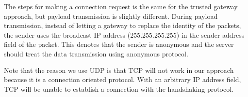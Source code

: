 The steps for making a connection request is the same for the
trusted gateway approach, but payload transmission is slightly
different. During payload transmission, instead of letting a
gateway to replace the identity of the packets, the sender uses
the broadcast IP address (255.255.255.255) in the sender address
field of the packet. This denotes that the sender is anonymous and
the server should treat the data transmission using anonymous
protocol.

Note that the reason we use UDP is that TCP will not work in our
approach because it is a connection oriented protocol. With an
arbitrary IP address field, TCP will be unable to establish a
connection with the handshaking protocol.

